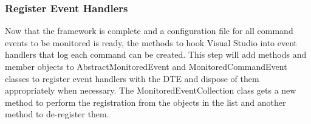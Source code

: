 \newpage



\subsubsection{Register Event Handlers}

Now that the framework is complete and a configuration file for all command events to be monitored is ready, the methods to hook Visual Studio into event handlers that log each command can be created.  This step will add methods and member objects to AbstractMonitoredEvent and MonitoredCommandEvent classes to register event handlers with the DTE and dispose of them appropriately when necessary.  The MonitoredEventCollection class gets a new method to perform the registration from the objects in the list and another method to de-register them.

